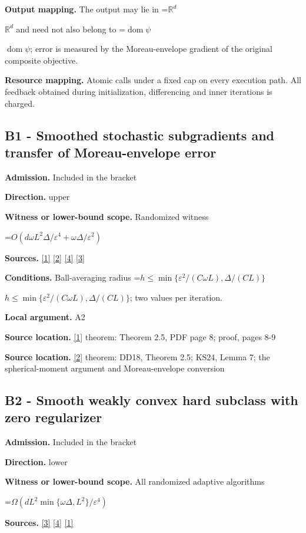 \documentclass[10pt,a4paper]{article}
\newcommand{\AtlasMath}[1]{\par\begingroup\centering\setbox0=\hbox{$\displaystyle #1$}\ifdim\wd0>1.4\linewidth\typeout{ATLAS WIDE FORMULA: \the\wd0}\fi\ifdim\wd0>\linewidth\resizebox{\linewidth}{!}{\box0}\else\box0\fi\par\endgroup}
\newcommand{\AtlasInlineMath}[1]{\begingroup\setbox0=\hbox{$#1$}\ifdim\wd0>.4\linewidth\endgroup\AtlasMath{#1}\else\endgroup$#1$\fi}
\begin{document}
\textbf{Output mapping.} The output may lie in \AtlasInlineMath{\mathbb{R}^d} and need not also belong to \AtlasInlineMath{\operatorname{dom}\psi}; error is measured by the Moreau-envelope gradient of the original composite objective.

\textbf{Resource mapping.} Atomic calls under a fixed cap on every execution path. All feedback obtained during initialization, differencing and inner iterations is charged.

\subsection{B1 - Smoothed stochastic subgradients and transfer of Moreau-envelope error}
\textbf{Admission.} Included in the bracket

\textbf{Direction.} upper

\textbf{Witness or lower-bound scope.} Randomized witness

\AtlasMath{O\!\left(d\omega L^2\Delta/\varepsilon^4+\omega\Delta/\varepsilon^2\right)}
\textbf{Sources.} \href{https://arxiv.org/pdf/1802.02988}{[1]} \href{https://www.jmlr.org/papers/volume25/23-1159/23-1159.pdf}{[2]} \href{https://jmlr.org/papers/volume18/16-632/16-632.pdf}{[4]} \href{https://arxiv.org/html/2610.19652v1}{[3]}

\textbf{Conditions.} Ball-averaging radius \AtlasInlineMath{h\le\min\{\varepsilon^2/(C\omega L),\Delta/(CL)\}}; two values per iteration.

\textbf{Local argument.} A2

\textbf{Source location.} \href{https://arxiv.org/pdf/1802.02988}{[1]} theorem: Theorem 2.5, PDF page 8; proof, pages 8-9

\textbf{Source location.} \href{https://www.jmlr.org/papers/volume25/23-1159/23-1159.pdf}{[2]} theorem: DD18, Theorem 2.5; KS24, Lemma 7; the spherical-moment argument and Moreau-envelope conversion

\subsection{B2 - Smooth weakly convex hard subclass with zero regularizer}
\textbf{Admission.} Included in the bracket

\textbf{Direction.} lower

\textbf{Witness or lower-bound scope.} All randomized adaptive algorithms

\AtlasMath{\Omega(dL^2\min\{\omega\Delta,L^2\}/\varepsilon^4)}
\textbf{Sources.} \href{https://arxiv.org/html/2610.19652v1}{[3]} \href{https://jmlr.org/papers/volume18/16-632/16-632.pdf}{[4]} \href{https://arxiv.org/pdf/1802.02988}{[1]}
\end{document}
